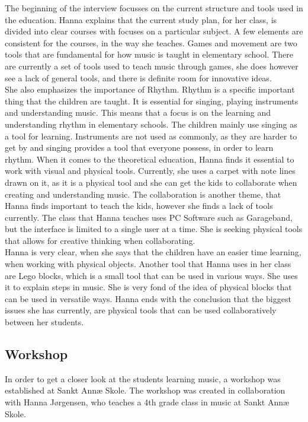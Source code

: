 The beginning of the interview focusses on the current structure and tools used in the education. Hanna explains that the current study plan, for her class, is divided into clear courses with focuses on a particular subject. A few elements are consistent for the courses, in the way she teaches. Games and movement are two tools that are fundamental for how music is taught in elementary school. There are currently a set of tools used to teach music through games, she does however see a lack of general tools, and there is definite room for innovative ideas.\\

She also emphasizes the importance of Rhythm. Rhythm is a specific important thing that the children are taught. It is essential for singing, playing instruments and understanding music. This means that a focus is on the learning and understanding rhythm in elementary schools. The children mainly use singing as a tool for learning. Instruments are not used as commonly, as they are harder to get by and singing provides a tool that everyone possess, in order to learn rhythm. When it comes to the theoretical education, Hanna finds it essential to work with visual and physical tools. Currently, she uses a carpet with note lines drawn on it, as it is a physical tool and she can get the kids to collaborate when creating and understanding music. The collaboration is another theme, that Hanna finds important to teach the kids, however she finds a lack of tools currently. The class that Hanna teaches uses PC Software such as Garageband, but the interface is limited to a single user at a time. She is seeking physical tools that allows for creative thinking when collaborating. \\

Hanna is very clear, when she says that the children have an easier time learning, when working with physical objects. Another tool that Hanna uses in her class are Lego blocks, which is a small tool that can be used in various ways. She uses it to explain steps in music. She is very fond of the idea of physical blocks that can be used in versatile ways.
Hanna ends with the conclusion that the biggest issues she has currently, are physical tools that can be used collaboratively between her students.\\


\subsection{Workshop}
In order to get a closer look at the students learning music, a workshop was established at Sankt Annæ Skole. The workshop was created in collaboration with Hanna Jørgensen, who teaches a 4th grade class in music at Sankt Annæ Skole.\\

